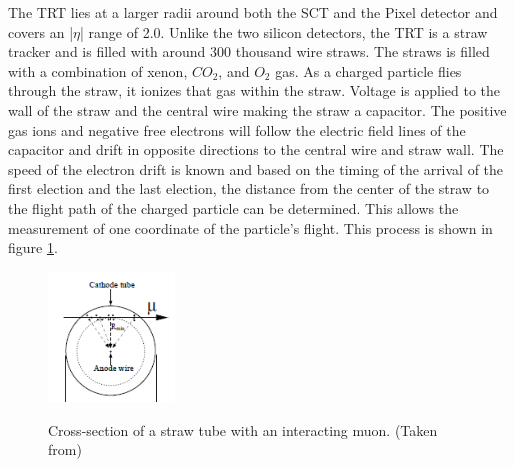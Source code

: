\indent The TRT lies at a larger radii around both the SCT and the Pixel detector and covers an |$\eta$| range of 2.0. Unlike the two silicon detectors, the TRT is a straw tracker and is filled with around 300 thousand wire straws. The straws is filled with a combination of xenon, $CO_2$, and $O_2$ gas. As a charged particle flies through the straw, it ionizes that gas within the straw. Voltage is applied to the wall of the straw and the central wire making the straw a capacitor. The positive gas ions and negative free electrons will follow the electric field lines of the capacitor and drift in opposite directions to the central wire and straw wall. The speed of the electron drift is known and based on the timing of the arrival of the first election and the last election, the distance from the center of the straw to the flight path of the charged particle can be determined. This allows the measurement of one coordinate of the particle's flight. This process is shown in figure \ref{LHC:fig:StrawTube}. \cite{biblio:JINST} ~\\
\begin{figure}[h!]
\centering
\includegraphics[width=0.3\textwidth]{figures/DET/ATLAS_Staw_Tube_Fig.PNG}
\\
\caption{ Cross-section of a straw tube with an interacting muon. (Taken from\cite{biblio:JINST}) \label{LHC:fig:StrawTube}}
\end{figure}

